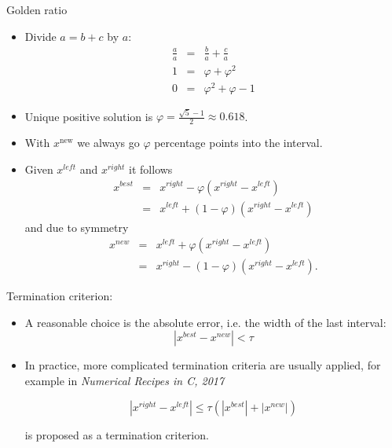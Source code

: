 \documentclass[11pt,compress,t,notes=noshow, xcolor=table]{beamer}
\begin{document}
\begin{vbframe}{Golden ratio}
\begin{itemize}
\item Divide $a = b + c$ by $a$:
\begin{eqnarray*}
\frac{a}{a} &=& \frac{b}{a} + \frac{c}{a} \\
1 &=& \varphi + \varphi^2 \\
0 &=& \varphi^2 + \varphi - 1
\end{eqnarray*}
\item Unique positive solution is $\varphi = \frac{\sqrt{5}-1}{2} \approx 0.618$.

\framebreak

\item With $x^{\text{new}}$ we always go $\varphi$ percentage points into the interval. 
\item Given $x^{left}$ and $x^{right}$ it follows
\begin{eqnarray*}
x^{best}&=&x^{right}-\varphi(x^{right}-x^{left})\\
&=&x^{left}+(1-\varphi)(x^{right}-x^{left})
\end{eqnarray*}
and due to symmetry
\begin{eqnarray*}
x^{new}&=& x^{left}+\varphi(x^{right}-x^{left})\\ &=& x^{right}-(1-\varphi)(x^{right}-x^{left}).
\end{eqnarray*}
\end{itemize}

\framebreak 

Termination criterion:

  \begin{itemize}
    \item A reasonable choice is the absolute error, i.e. the width of the last interval:
    $$
    |x^{best}-x^{new}| < \tau
    $$
    \item In practice, more complicated termination criteria are usually applied, for example in \emph{Numerical Recipes in C, 2017}

    $$
    |x^{right}-x^{left}| \le \tau (|x^{best}| + |x^{new}|)
    $$

    is proposed as a termination criterion.

\end{itemize}

\end{vbframe}

\endlecture
\end{document}
